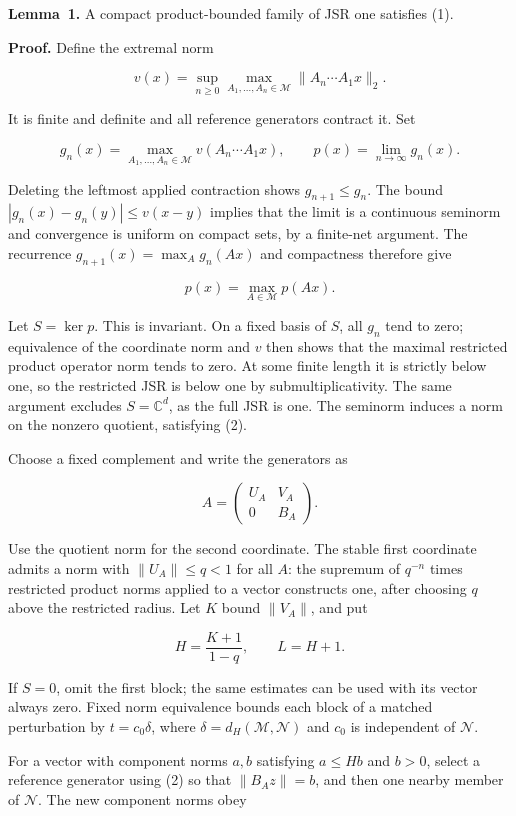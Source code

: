 \documentclass[11pt,a4paper]{article}
\begin{document}
\textbf{Lemma~1.} A compact product-bounded family of JSR one satisfies (1).

\textbf{Proof.} Define the extremal norm

\[
v(x)=\sup_{n\ge0}\max_{A_1,\ldots,A_n\in\mathcal M}
\|A_n\cdots A_1x\|_2.
\]

It is finite and definite and all reference generators contract it. Set

\[
g_n(x)=\max_{A_1,\ldots,A_n\in\mathcal M}v(A_n\cdots A_1x),
\qquad p(x)=\lim_{n\to\infty}g_n(x).
\]

Deleting the leftmost applied contraction shows \(g_{n+1}\le g_n\). The bound \(|g_n(x)-g_n(y)|\le v(x-y)\) implies that the limit is a continuous seminorm and convergence is uniform on compact sets, by a finite-net argument. The recurrence \(g_{n+1}(x)=\max_Ag_n(Ax)\) and compactness therefore give

\[
p(x)=\max_{A\in\mathcal M}p(Ax).
\tag{2}
\]

Let \(S=\ker p\). This is invariant. On a fixed basis of \(S\), all \(g_n\) tend to zero; equivalence of the coordinate norm and \(v\) then shows that the maximal restricted product operator norm tends to zero. At some finite length it is strictly below one, so the restricted JSR is below one by submultiplicativity. The same argument excludes \(S=\mathbb C^d\), as the full JSR is one. The seminorm induces a norm on the nonzero quotient, satisfying (2).

Choose a fixed complement and write the generators as

\[
A=\begin{pmatrix}U_A&V_A\\0&B_A\end{pmatrix}.
\]

Use the quotient norm for the second coordinate. The stable first coordinate admits a norm with \(\|U_A\|\le q<1\) for all \(A\): the supremum of \(q^{-n}\) times restricted product norms applied to a vector constructs one, after choosing \(q\) above the restricted radius. Let \(K\) bound \(\|V_A\|\), and put

\[
H=\frac{K+1}{1-q},\qquad L=H+1.
\]

If \(S=0\), omit the first block; the same estimates can be used with its vector always zero. Fixed norm equivalence bounds each block of a matched perturbation by \(t=c_0\delta\), where \(\delta=d_H(\mathcal M,\mathcal N)\) and \(c_0\) is independent of \(\mathcal N\).

For a vector with component norms \(a,b\) satisfying \(a\le Hb\) and \(b>0\), select a reference generator using (2) so that \(\|B_Az\|=b\), and then one nearby member of \(\mathcal N\). The new component norms obey
\end{document}
